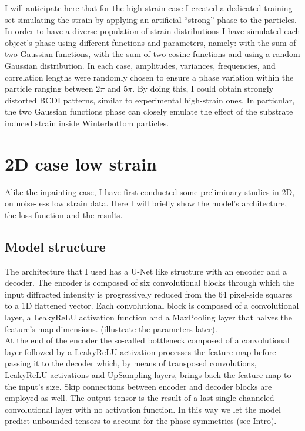 I will anticipate here that for the high strain case I created a dedicated training set simulating the strain by applying 
an artificial ``strong'' phase to the particles. In order to have a diverse population of strain distributions I have 
simulated each object's phase using different functions and parameters, namely: with the sum of two Gaussian functions,
with the sum of two cosine functions and using a random Gaussian distribution. In each case, amplitudes, variances, 
frequencies, and correlation lengths were randomly chosen to ensure a phase variation within the particle ranging between 
$2\pi$ and $5\pi$. By doing this, I could obtain strongly distorted BCDI patterns, similar to experimental high-strain ones. 
In particular, the two Gaussian functions phase can closely emulate the effect of the substrate induced strain inside Winterbottom 
particles. 

\section{2D case low strain}\label{chp:2d_nostrain}
Alike the inpainting case, I have first conducted some preliminary studies in 2D, on noise-less low strain data. Here I will 
briefly show the model's architecture, the loss function and the results. 
\subsection{Model structure}
The architecture that I used has a U-Net like structure with an encoder and a decoder. 
The encoder is composed of six convolutional blocks through which the input diffracted intensity is progressively 
reduced from the 64 pixel-side squares to a 1D flattened vector. Each convolutional block is composed of a convolutional 
layer, a LeakyReLU activation function and a MaxPooling layer that halves the feature's map dimensions. (illustrate the 
parameters later). \\
At the end of the encoder the so-called bottleneck composed of a convolutional layer followed by a LeakyReLU activation 
processes the feature map before passing it to the decoder which, by means of transposed convolutions, LeakyReLU activations 
and UpSampling layers, brings back the feature map to the input's size. Skip connections between encoder and decoder blocks 
are employed as well. The output tensor is the result of a last single-channeled convolutional layer with no activation function. 
In this way we let the model predict unbounded tensors to account for the phase symmetries (see Intro). 

